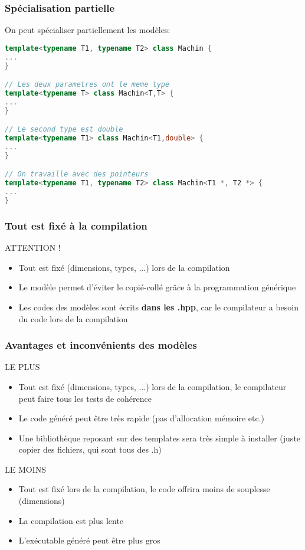 \documentclass{beamer}
\begin{document}
\begin{frame}[fragile=singleslide,shrink=20]
\frametitle {Spécialisation partielle}

On peut spécialiser partiellement les modèles:

\begin{lstlisting}[language=c++]
template<typename T1, typename T2> class Machin {
...
}

// Les deux parametres ont le meme type
template<typename T> class Machin<T,T> {
...
}

// Le second type est double
template<typename T1> class Machin<T1,double> {
...
}

// On travaille avec des pointeurs
template<typename T1, typename T2> class Machin<T1 *, T2 *> {
...
}
\end{lstlisting}

\end{frame}

\begin{frame}
\frametitle {Tout est fixé à la compilation}

\begin{block}{ATTENTION !}
\begin{itemize}
\item{Tout est fixé (dimensions, types, ...) lors de la compilation}
\item{Le modèle permet d'éviter le copié-collé grâce à la programmation générique}
\item{Les codes des modèles sont écrits \textbf{dans les .hpp}, car le compilateur a besoin du code lors de la compilation}
\end{itemize}
\end{block}

\end{frame}

\begin{frame}
\frametitle {Avantages et inconvénients des modèles}

\begin{block}{LE PLUS}
\begin{itemize}
\item{Tout est fixé (dimensions, types, ...) lors de la compilation, le compilateur peut faire tous les tests de cohérence}
\item{Le code généré peut être très rapide (pas d'allocation mémoire etc.)}
\item{Une bibliothèque reposant sur des templates sera très simple à installer (juste copier des fichiers, qui sont tous des .h)}
\end{itemize}
\end{block}

\begin{block}{LE MOINS}
\begin{itemize}
\item{Tout est fixé lors de la compilation, le code offrira moins de souplesse (dimensions)}
\item{La compilation est plus lente}
\item{L'exécutable généré peut être plus gros}
\end{itemize}
\end{block}
\end{frame}
\end{document}
